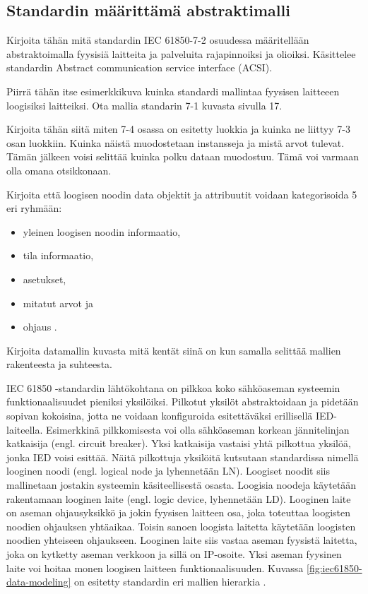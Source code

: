 \subsection{Standardin määrittämä abstraktimalli}
\begin{it}
	Kirjoita tähän mitä standardin IEC 61850-7-2 osuudessa määritellään abstraktoimalla fyysisiä laitteita ja palveluita rajapinnoiksi ja olioiksi. Käsittelee standardin Abstract communication service interface (ACSI).

	Piirrä tähän itse esimerkkikuva kuinka standardi mallintaa fyysisen laitteeen loogisiksi laitteiksi. Ota mallia standarin 7-1 kuvasta sivulla 17.

	Kirjoita tähän siitä miten 7-4 osassa on esitetty luokkia ja kuinka ne liittyy 7-3 osan luokkiin. Kuinka näistä muodostetaan instansseja ja mistä arvot tulevat. Tämän jälkeen voisi selittää kuinka polku dataan muodostuu. Tämä voi varmaan olla omana otsikkonaan.
	
	Kirjoita että loogisen noodin data objektit ja attribuutit voidaan kategorisoida 5 eri ryhmään:
	\begin{itemize}
		\item yleinen loogisen noodin informaatio,
		\item tila informaatio,
		\item asetukset, 
		\item mitatut arvot ja
		\item ohjaus \cite[s.~25]{IEC61850-1}.
	\end{itemize}
	
	Kirjoita datamallin kuvasta mitä kentät siinä on kun samalla selittää mallien rakenteesta ja suhteesta.
\end{it}

IEC 61850 -standardin lähtökohtana on pilkkoa koko sähköaseman systeemin funktionaalisuudet pieniksi yksilöiksi. Pilkotut yksilöt abstraktoidaan ja pidetään sopivan kokoisina, jotta ne voidaan konfiguroida esitettäväksi erillisellä IED-laiteella. Esimerkkinä pilkkomisesta voi olla sähköaseman korkean jännitelinjan katkaisija (engl. circuit breaker). Yksi katkaisija vastaisi yhtä pilkottua yksilöä, jonka IED voisi esittää. Näitä pilkottuja yksilöitä kutsutaan standardissa nimellä looginen noodi (engl. logical node ja lyhennetään LN). Loogiset noodit siis mallinetaan jostakin systeemin käsiteellisestä osasta. Loogisia noodeja käytetään rakentamaan looginen laite (engl. logic device, lyhennetään LD). Looginen laite on aseman ohjausyksikkö ja jokin fyysisen laitteen osa, joka toteuttaa loogisten noodien ohjauksen yhtäaikaa. Toisin sanoen loogista laitetta käytetään loogisten noodien yhteiseen ohjaukseen. Looginen laite siis vastaa aseman fyysistä laitetta, joka on kytketty aseman verkkoon ja sillä on IP-osoite. Yksi aseman fyysinen laite voi hoitaa monen loogisen laitteen funktionaalisuuden. Kuvassa \ref{fig:iec61850-data-modeling} on esitetty standardin eri mallien hierarkia \cite[s.~2]{Camachi2017} \cite[s.~24]{IEC61850-1}.

